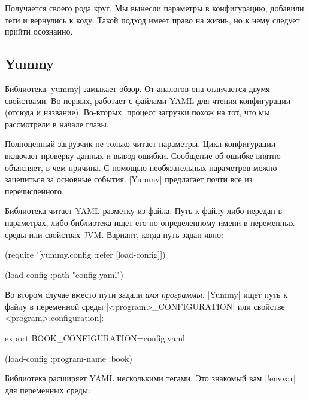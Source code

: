 Получается своего рода круг. Мы вынесли параметры в конфигурацию, добавили теги
и вернулись к коду. Такой подход имеет право на жизнь, но к нему следует прийти
осознанно.

\subsection{Yummy}

Библиотека \spverb|yummy| замыкает
обзор. От аналогов она отличается двумя свойствами. Во-первых, работает с
файлами YAML для чтения конфигурации (отсюда и название). Во-вторых, процесс
загрузки похож на тот, что мы рассмотрели в начале главы.

Полноценный загрузчик не только читает параметры. Цикл конфигурации включает
проверку данных и вывод ошибки. Сообщение об ошибке внятно объясняет, в чем
причина. С помощью необязательных параметров можно зацепиться за основные
события. \spverb|Yummy| предлагает почти все из перечисленного.

Библиотека читает YAML-разметку из файла. Путь к файлу либо передан в
параметрах, либо библиотека ищет его по определенному имени в переменных среды
или свойствах JVM. Вариант, когда путь задан явно:

\begin{english}
  \begin{clojure}
(require '[yummy.config :refer [load-config]])

(load-config {:path "config.yaml"})
  \end{clojure}
\end{english}

Во втором случае вместо пути задали \emph{имя программы}. \spverb|Yummy| ищет
путь к файлу в переменной среды \spverb|<program>_CONFIGURATION| или свойстве
\spverb|<program>.configuration|:

\begin{english}
  \begin{bash}
export BOOK_CONFIGURATION=config.yaml
  \end{bash}
\end{english}

\begin{english}
  \begin{clojure}
(load-config {:program-name :book})
  \end{clojure}
\end{english}

Библиотека расширяет YAML несколькими тегами. Это знакомый вам \spverb|!envvar|
для переменных среды:

